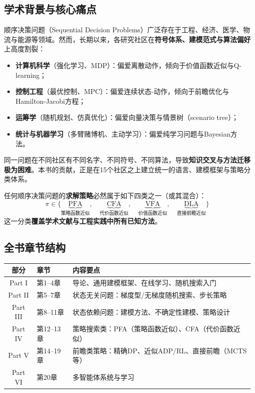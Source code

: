 \documentclass[11pt, a4paper]{article}
\begin{document}
\subsection{学术背景与核心痛点}

顺序决策问题（Sequential Decision Problems）广泛存在于工程、经济、医学、物流与能源等领域。然而，长期以来，各研究社区在\textbf{符号体系、建模范式与算法偏好}上高度割裂：

\begin{itemize}[leftmargin=2em, itemsep=2pt]
  \item \textbf{计算机科学}（强化学习、MDP）：偏爱离散动作，倾向于价值函数近似与Q-learning；
  \item \textbf{控制工程}（最优控制、MPC）：偏爱连续状态-动作，倾向于前瞻优化与Hamilton-Jacobi方程；
  \item \textbf{运筹学}（随机规划、仿真优化）：偏爱向量决策与情景树（scenario tree）；
  \item \textbf{统计与机器学习}（多臂赌博机、主动学习）：偏爱纯学习问题与Bayesian方法。
\end{itemize}

同一问题在不同社区有不同名字、不同符号、不同算法，导致\textbf{知识交叉与方法迁移极为困难}。本书的贡献，正是在15个社区之上建立统一的语言、建模框架与策略分类体系。

\begin{tcolorbox}[keybox={作者的核心声明（可证伪的通用性命题）}]
任何顺序决策问题的\textbf{求解策略}必然属于如下四类之一（或其混合）：
\[
  \pi \in \{\underbrace{\text{PFA}}_{\text{策略函数近似}},\quad 
            \underbrace{\text{CFA}}_{\text{代价函数近似}},\quad 
            \underbrace{\text{VFA}}_{\text{价值函数近似}},\quad 
            \underbrace{\text{DLA}}_{\text{直接前瞻近似}}\}
\]
这一分类\textbf{覆盖学术文献与工程实践中所有已知方法}。
\end{tcolorbox}

\subsection{全书章节结构}

\begin{center}
\begin{tabular}{clp{9.5cm}}
\toprule
\textbf{部分} & \textbf{章节} & \textbf{内容要点} \\
\midrule
Part I & 第1--4章 & 导论、通用建模框架、在线学习、随机搜索入门 \\
Part II & 第5--7章 & 状态无关问题：梯度型/无梯度随机搜索、步长策略 \\
Part III & 第8--11章 & 状态依赖问题：建模方法、不确定性建模、策略设计 \\
Part IV & 第12--13章 & 策略搜索类：PFA（策略函数近似）、CFA（代价函数近似） \\
Part V & 第14--19章 & 前瞻类策略：精确DP、近似ADP/RL、直接前瞻（MCTS等） \\
Part VI & 第20章 & 多智能体系统与学习 \\
\bottomrule
\end{tabular}
\end{center}
\end{document}
